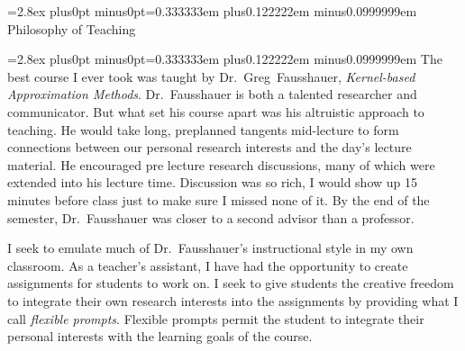 


\frenchspacing
{}

\def\fontspacing{\baselineskip=2.8ex plus0pt minus0pt\spaceskip=0.333333em plus0.122222em minus0.0999999em}

\twentyrm
\fontspacing
\noindent
Philosophy\kern5pt of\kern7pt Teaching
\bigskip

\tenrm
\fontspacing
\noindent
The best course I ever took was taught by Dr.~Greg~Fausshauer, {\it Kernel-based Approximation Methods}.
Dr.~Fausshauer is both a talented researcher and communicator.
But what set his course apart was his altruistic approach to teaching.
He would take long, preplanned tangents mid-lecture to form connections between our personal research interests and the day's lecture material.
He encouraged pre lecture research discussions, many of which were extended into his lecture time.
Discussion was so rich, I would show up 15 minutes before class just to make sure I missed none of it.
By the end of the semester, Dr.~Fausshauer was closer to a second advisor than a professor.

\medskip
\noindent
I seek to emulate much of Dr.~Fausshauer's instructional style in my own classroom.
As a teacher's assistant, I have had the opportunity to create assignments for students to work on.
I seek to give students the creative freedom to integrate their own research interests into the assignments by providing what I call {\it flexible prompts}.
Flexible prompts permit the student to integrate their personal interests with the learning goals of the course.

\bye

